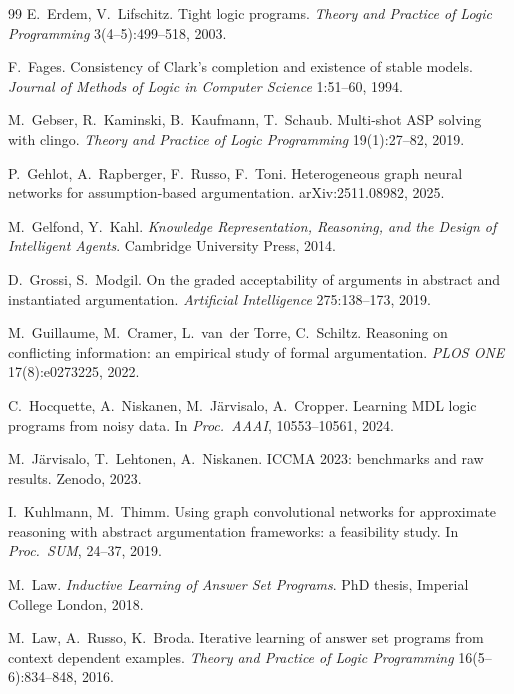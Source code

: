 \documentclass[review,12pt]{elsarticle}
\theoremstyle{definition}
\theoremstyle{remark}
\begin{document}
\begin{thebibliography}{99}
E.~Erdem, V.~Lifschitz.
Tight logic programs.
\emph{Theory and Practice of Logic Programming} 3(4--5):499--518, 2003.

F.~Fages.
Consistency of Clark's completion and existence of stable models.
\emph{Journal of Methods of Logic in Computer Science} 1:51--60, 1994.

M.~Gebser, R.~Kaminski, B.~Kaufmann, T.~Schaub.
Multi-shot ASP solving with clingo.
\emph{Theory and Practice of Logic Programming} 19(1):27--82, 2019.

P.~Gehlot, A.~Rapberger, F.~Russo, F.~Toni.
Heterogeneous graph neural networks for assumption-based argumentation.
arXiv:2511.08982, 2025.

M.~Gelfond, Y.~Kahl.
\emph{Knowledge Representation, Reasoning, and the Design of Intelligent
Agents}. Cambridge University Press, 2014.

D.~Grossi, S.~Modgil.
On the graded acceptability of arguments in abstract and instantiated
argumentation.
\emph{Artificial Intelligence} 275:138--173, 2019.

M.~Guillaume, M.~Cramer, L.~van~der Torre, C.~Schiltz.
Reasoning on conflicting information: an empirical study of formal
argumentation.
\emph{PLOS ONE} 17(8):e0273225, 2022.

C.~Hocquette, A.~Niskanen, M.~J{\"a}rvisalo, A.~Cropper.
Learning MDL logic programs from noisy data.
In \emph{Proc.\ AAAI}, 10553--10561, 2024.

M.~J{\"a}rvisalo, T.~Lehtonen, A.~Niskanen.
ICCMA 2023: benchmarks and raw results. Zenodo, 2023.

I.~Kuhlmann, M.~Thimm.
Using graph convolutional networks for approximate reasoning with abstract
argumentation frameworks: a feasibility study.
In \emph{Proc.\ SUM}, 24--37, 2019.

M.~Law.
\emph{Inductive Learning of Answer Set Programs}.
PhD thesis, Imperial College London, 2018.

M.~Law, A.~Russo, K.~Broda.
Iterative learning of answer set programs from context dependent examples.
\emph{Theory and Practice of Logic Programming} 16(5--6):834--848, 2016.


\end{thebibliography}
\end{document}

